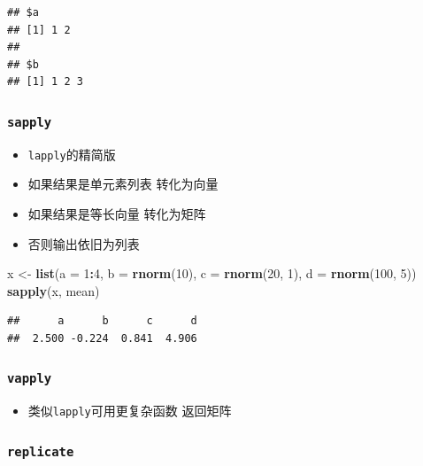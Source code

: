 \documentclass[]{book}
\newenvironment{Shaded}{\begin{snugshade}}{\end{snugshade}}
\newcommand{\DataTypeTok}[1]{\textcolor[rgb]{0.13,0.29,0.53}{#1}}
\newcommand{\DecValTok}[1]{\textcolor[rgb]{0.00,0.00,0.81}{#1}}
\newcommand{\KeywordTok}[1]{\textcolor[rgb]{0.13,0.29,0.53}{\textbf{#1}}}
\newcommand{\NormalTok}[1]{#1}
\newcommand{\OperatorTok}[1]{\textcolor[rgb]{0.81,0.36,0.00}{\textbf{#1}}}
\newcommand{\StringTok}[1]{\textcolor[rgb]{0.31,0.60,0.02}{#1}}
\providecommand{\tightlist}{%
  \setlength{\itemsep}{0pt}\setlength{\parskip}{0pt}}
\begin{document}
\begin{verbatim}
## $a
## [1] 1 2
## 
## $b
## [1] 1 2 3
\end{verbatim}

\hypertarget{sapply}{%
\subsubsection{\texorpdfstring{\texttt{sapply}}{sapply}}\label{sapply}}

\begin{itemize}
\tightlist
\item
  \texttt{lapply}的精简版
\item
  如果结果是单元素列表 转化为向量
\item
  如果结果是等长向量 转化为矩阵
\item
  否则输出依旧为列表
\end{itemize}

\begin{Shaded}
\begin{Highlighting}[]
\NormalTok{x <-}\StringTok{ }\KeywordTok{list}\NormalTok{(}\DataTypeTok{a =} \DecValTok{1}\OperatorTok{:}\DecValTok{4}\NormalTok{, }\DataTypeTok{b =} \KeywordTok{rnorm}\NormalTok{(}\DecValTok{10}\NormalTok{), }\DataTypeTok{c =} \KeywordTok{rnorm}\NormalTok{(}\DecValTok{20}\NormalTok{, }\DecValTok{1}\NormalTok{), }\DataTypeTok{d =} \KeywordTok{rnorm}\NormalTok{(}\DecValTok{100}\NormalTok{, }\DecValTok{5}\NormalTok{))}
\KeywordTok{sapply}\NormalTok{(x, mean)}
\end{Highlighting}
\end{Shaded}

\begin{verbatim}
##      a      b      c      d 
##  2.500 -0.224  0.841  4.906
\end{verbatim}

\hypertarget{vapply}{%
\subsubsection{\texorpdfstring{\texttt{vapply}}{vapply}}\label{vapply}}

\begin{itemize}
\tightlist
\item
  类似\texttt{lapply}可用更复杂函数 返回矩阵
\end{itemize}

\hypertarget{replicate}{%
\subsubsection{\texorpdfstring{\texttt{replicate}}{replicate}}\label{replicate}}
\end{document}
